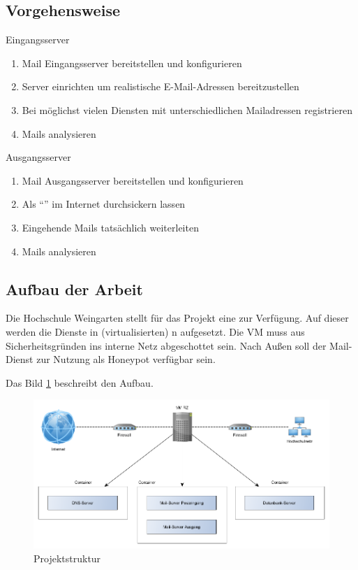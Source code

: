 \documentclass[a4paper,11pt,singlespacing]{article}
\begin{document}
	\subsection{Vorgehensweise}\label{sec:EinleitungVorgehensweise}
		Eingangsserver
		\begin{enumerate}
		\item Mail Eingangsserver bereitstellen und konfigurieren
		\item {} Server einrichten um realistische E-Mail-Adressen bereitzustellen
		\item Bei möglichst vielen Diensten mit unterschiedlichen Mailadressen registrieren
		\item Mails analysieren
		\end{enumerate}

		Ausgangsserver
		\begin{enumerate}
		\item Mail Ausgangsserver bereitstellen und konfigurieren
		\item Als "`"' im Internet durchsickern lassen
		\item Eingehende Mails tatsächlich weiterleiten
		\item Mails analysieren
		\end{enumerate}

	\subsection{Aufbau der Arbeit}\label{sec:EinleitungAufbau}
		Die Hochschule Weingarten stellt für das Projekt eine  zur Verfügung.
		Auf dieser werden die Dienste in (virtualisierten) n aufgesetzt.
		Die VM muss aus Sicherheitsgründen ins interne Netz abgeschottet sein.
		Nach Außen soll der Mail-Dienst zur Nutzung als Honeypot verfügbar sein.

		Das Bild \ref{fig:Hierarchy} beschreibt den Aufbau.

		\begin{figure}
		\includegraphics[width=\linewidth]{2-Hierarchy.png}
		\caption{Projektstruktur}
		\label{fig:Hierarchy}
		\end{figure}
\end{document}

